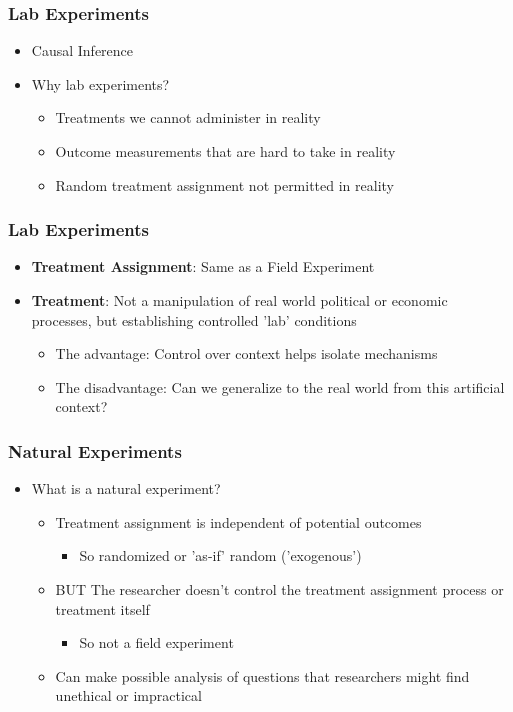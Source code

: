 \documentclass[xcolor=x11names,compress]{beamer}\usepackage[]{graphicx}\usepackage[]{color}
\renewcommand{\(}{\begin{columns}}
\renewcommand{\)}{\end{columns}}
\newcommand{\<}[1]{\begin{column}{#1}}
\renewcommand{\>}{\end{column}}
\begin{document}
\begin{frame}
\frametitle{Lab Experiments}
\begin{itemize}
\item Causal Inference
\pause
\item Why lab experiments?
\pause
\begin{itemize}
\item Treatments we cannot administer in reality
\item Outcome measurements that are hard to take in reality
\item Random treatment assignment not permitted in reality
\end{itemize}
\end{itemize}
\end{frame}

\begin{frame}
\frametitle{Lab Experiments}
\begin{itemize}
\item \textbf{Treatment Assignment}: Same as a Field Experiment
\pause
\item \textbf{Treatment}: Not a manipulation of real world political or economic processes, but establishing controlled 'lab' conditions
\pause
\begin{itemize}
\item The advantage: Control over context helps isolate mechanisms
\item The disadvantage: Can we generalize to the real world from this artificial context?
\end{itemize}
\end{itemize}
\end{frame}

\begin{frame}
\frametitle{Natural Experiments}
\begin{itemize}
\item What is a natural experiment?
\pause
\begin{itemize}
\item Treatment assignment is independent of potential outcomes
\begin{itemize}
\item So randomized or 'as-if' random ('exogenous')
\end{itemize}
\pause
\item BUT The researcher doesn't control the treatment assignment process or treatment itself
\begin{itemize}
\item So not a field experiment
\end{itemize}
\item Can make possible analysis of questions that researchers might find unethical or impractical
\end{itemize}
\end{itemize}
\end{frame}
\end{document}
